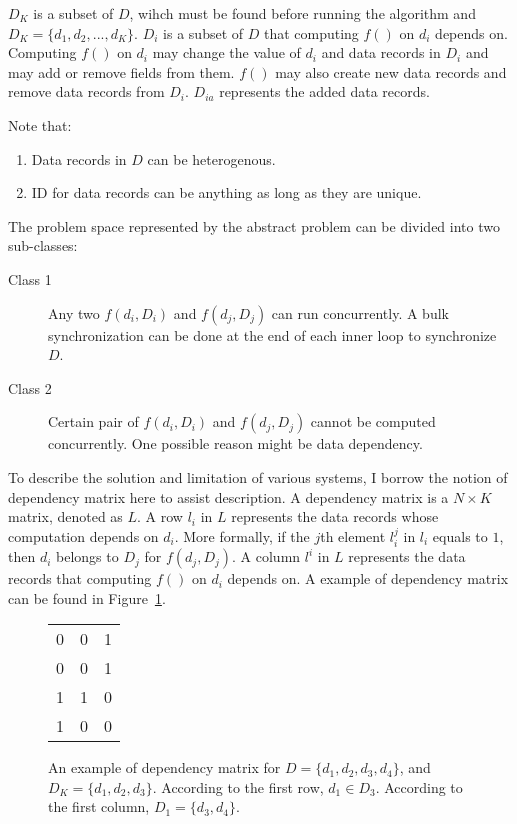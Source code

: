 \documentclass[10pt, twocolumn, a4paper]{article}
\begin{document}
$D_K$ is a subset of $D$, wihch must be found before running the algorithm and $D_K = \{d_1, d_2, ..., d_K\}$. $D_i$ is a subset of $D$ that computing $f()$ on $d_i$ depends on. Computing $f()$ on $d_i$ may change the value of $d_i$ and data records in $D_i$ and may add or remove fields from them. $f()$ may also create new data records and remove data records from $D_i$. $D_{ia}$ represents the added data records.


Note that:
\begin{enumerate}
\item Data records in $D$ can be heterogenous.
\item ID for data records can be anything as long as they are unique.
\end{enumerate}

The problem space represented by the abstract problem can be divided into two sub-classes:

\begin{description}
\item[Class 1] Any two $f(d_i, D_i)$ and $f(d_j, D_j)$ can run concurrently. A bulk synchronization can be done at the end of each inner loop to synchronize $D$.
\item[Class 2] Certain pair of $f(d_i, D_i)$ and $f(d_j, D_j)$ cannot be computed concurrently. One possible reason might be data dependency.
\end{description}

To describe the solution and limitation of various systems, I borrow the notion of dependency matrix here to assist description. A dependency matrix is a $N \times K$ matrix, denoted as $L$. A row $l_i$ in $L$ represents the data records whose computation depends on $d_i$. More formally, if the $j$th element $l_i^j$ in $l_i$ equals to $1$, then $d_i$ belongs to $D_j$ for $f(d_j, D_j)$.  A column $l^i$ in $L$ represents the data records that computing $f()$ on $d_i$ depends on. A example of dependency matrix can be found in Figure~\ref{fig:depm}.

\begin{figure}[h!]
  \begin{center}
  \begin{tabular}{c c c}
    0 & 0  & 1 \\
    0 & 0  & 1 \\
    1 & 1  & 0 \\
    1 & 0  & 0
  \end{tabular}
  \end{center}
  \caption{An example of dependency matrix for $D = \{d_1, d_2, d_3, d_4\}$, and $D_K = \{d_1, d_2, d_3\}$. According to the first row, $d_1 \in D_3$. According to the first column, $D_1 = \{d_3, d_4\}$.}
  \label{fig:depm}
\end{figure}
\end{document}
